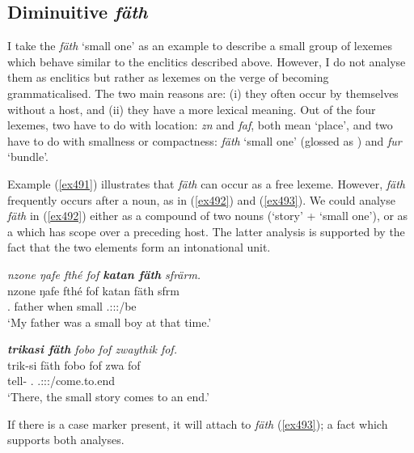 \subsection{Diminuitive \emph{fäth}}\label{diminuitivefaeth}

I take the  \emph{fäth} `small one' as an example to describe a small group of lexemes which behave similar to the enclitics described above. However, I do not analyse them as enclitics but rather as lexemes on the verge of becoming grammaticalised. The two main reasons are: (i) they often occur by themselves without a host, and (ii) they have a more lexical meaning. Out of the four lexemes, two have to do with location: \emph{zn} and \emph{faf}, both mean `place', and two have to do with smallness or compactness: \emph{fäth} `small one' (glossed as \Dim) and \emph{fur} `bundle'.

Example (\ref{ex491}) illustrates that \emph{fäth} can occur as a free lexeme. However, \emph{fäth} frequently occurs after a noun, as in (\ref{ex492}) and (\ref{ex493}). We could analyse \emph{fäth} in (\ref{ex492}) either as a compound of two nouns (`story' + `small one'), or as a   which has scope over a preceding host. The latter analysis is supported by the fact that the two elements form an intonational unit.

\begin{exe}
	\ex \emph{nzone ŋafe fthé fof \textbf{katan fäth} sfrärm.}\\
	\gll nzone ŋafe fthé fof katan fäth sfrm\\
	\Fsg.{\Poss} father when {\Emph} small \Dim{} \Tsg.\Masc:\Sbj:\Pst:\Dur/be\\
	\trans `My father was a small boy at that time.'
	\label{ex491}
\end{exe}
\begin{exe}
	\ex \emph{\textbf{trikasi fäth} fobo fof zwaythik fof.}\\
	\gll trik-si fäth fobo fof zwa fof\\
	tell-{\Nmlz} \Dim{} \Dist.{\All} {\Emph} \Tsg.\F:\Sbj:\Rpst:\Ipfv/come.to.end \Emph\\
	\trans `There, the small story comes to an end.'
	\label{ex492}
\end{exe}

If there is a case marker present, it will attach to \emph{fäth} (\ref{ex493}); a fact which supports both analyses.

